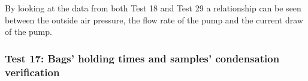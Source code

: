 By looking at the data from both Test 18 and Test 29 a relationship can be seen between the outside air pressure, the flow rate of the pump and the current draw of the pump. 

\subsubsection{Test 17: Bags' holding times and samples' condensation verification}


